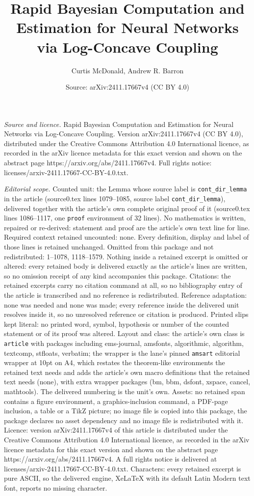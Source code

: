 \documentclass[10pt,a4paper]{amsart}
\title[Rapid Bayesian Computation and Estimation for Neural Network]{Rapid Bayesian Computation and Estimation for Neural Networks via Log-Concave Coupling}
\author{Curtis McDonald, Andrew R. Barron}
\date{Source: arXiv:2411.17667v4 (CC BY 4.0)}
\begin{document}
\maketitle

\noindent\emph{Source and licence.} Rapid Bayesian Computation and Estimation for Neural Networks via Log-Concave Coupling. Version arXiv:2411.17667v4 (CC BY 4.0), distributed under the Creative Commons Attribution 4.0 International licence, as recorded in the arXiv licence metadata for this exact version and shown on the abstract page https://arxiv.org/abs/2411.17667v4. Full rights notice: licenses/arxiv-2411.17667-CC-BY-4.0.txt.\par\smallskip

\noindent\textit{Editorial scope.} Counted unit: the Lemma whose source label is \texttt{cont\_dir\_lemma} in the article (source0.tex lines 1079--1085, source label \texttt{cont\_dir\_lemma}), delivered together with the article's own complete original proof of it (source0.tex lines 1086--1117, one \texttt{proof} environment of 32 lines). No mathematics is written, repaired or re-derived: statement and proof are the article's own text line for line. Required context retained uncounted: none. Every definition, display and label of those lines is retained unchanged. Omitted from this package and not redistributed: 1--1078, 1118--1579. Nothing inside a retained excerpt is omitted or altered: every retained body is delivered exactly as the article's lines are written, so no omission receipt of any kind accompanies this package. Citations: the retained excerpts carry no citation command at all, so no bibliography entry of the article is transcribed and no reference is redistributed. Reference adaptation: none was needed and none was made; every reference inside the delivered unit resolves inside it, so no unresolved reference or citation is produced. Printed slips kept literal: no printed word, symbol, hypothesis or number of the counted statement or of its proof was altered. Layout and class: the article's own class is \texttt{article} with packages including ems-journal, amsfonts, algorithmic, algorithm, textcomp, stfloats, verbatim; the wrapper is the lane's pinned \texttt{amsart} editorial wrapper at 10pt on A4, which restates the theorem-like environments the retained text needs and adds the article's own macro definitions that the retained text needs (none), with extra wrapper packages (bm, bbm, dsfont, xspace, cancel, mathtools). The delivered numbering is the unit's own. Assets: no retained span contains a figure environment, a graphics-inclusion command, a PDF-page inclusion, a table or a TikZ picture; no image file is copied into this package, the package declares no asset dependency and no image file is redistributed with it. Licence: version arXiv:2411.17667v4 of this article is distributed under the Creative Commons Attribution 4.0 International licence, as recorded in the arXiv licence metadata for this exact version and shown on the abstract page https://arxiv.org/abs/2411.17667v4. A full rights notice is delivered at licenses/arxiv-2411.17667-CC-BY-4.0.txt. Characters: every retained excerpt is pure ASCII, so the delivered engine, XeLaTeX with its default Latin Modern text font, reports no missing character.
\end{document}
